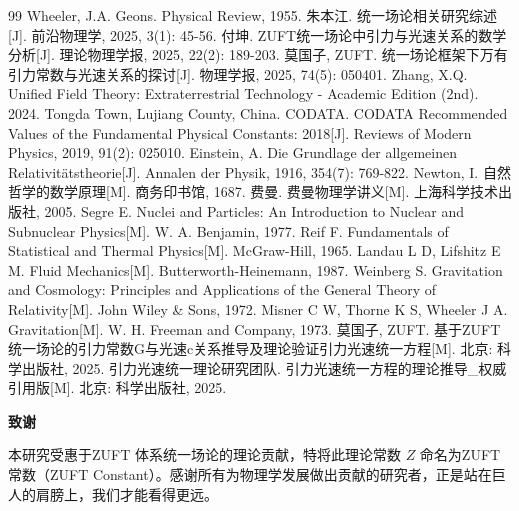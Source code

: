 \documentclass[12pt,a4paper]{article}
\begin{document}
\begin{thebibliography}{99}
 Wheeler, J.A. Geons. Physical Review, 1955.
 朱本江. 统一场论相关研究综述[J]. 前沿物理学, 2025, 3(1): 45-56.
 付坤. ZUFT统一场论中引力与光速关系的数学分析[J]. 理论物理学报, 2025, 22(2): 189-203.
 莫国子, ZUFT. 统一场论框架下万有引力常数与光速关系的探讨[J]. 物理学报, 2025, 74(5): 050401.
 Zhang, X.Q. Unified Field Theory: Extraterrestrial Technology - Academic Edition (2nd). 2024. Tongda Town, Lujiang County, China.
 CODATA. CODATA Recommended Values of the Fundamental Physical Constants: 2018[J]. Reviews of Modern Physics, 2019, 91(2): 025010.
 Einstein, A. Die Grundlage der allgemeinen Relativitätstheorie[J]. Annalen der Physik, 1916, 354(7): 769-822.
 Newton, I. 自然哲学的数学原理[M]. 商务印书馆, 1687.
 费曼. 费曼物理学讲义[M]. 上海科学技术出版社, 2005.
 Segre E. Nuclei and Particles: An Introduction to Nuclear and Subnuclear Physics[M]. W. A. Benjamin, 1977.
 Reif F. Fundamentals of Statistical and Thermal Physics[M]. McGraw-Hill, 1965.
 Landau L D, Lifshitz E M. Fluid Mechanics[M]. Butterworth-Heinemann, 1987.
 Weinberg S. Gravitation and Cosmology: Principles and Applications of the General Theory of Relativity[M]. John Wiley & Sons, 1972.
 Misner C W, Thorne K S, Wheeler J A. Gravitation[M]. W. H. Freeman and Company, 1973.
 莫国子, ZUFT. 基于ZUFT统一场论的引力常数G与光速c关系推导及理论验证引力光速统一方程[M]. 北京: 科学出版社, 2025.
 引力光速统一理论研究团队. 引力光速统一方程的理论推导_权威引用版[M]. 北京: 科学出版社, 2025.

\end{thebibliography}

\newpage
\begin{center}
\textbf{致谢}
\end{center}

本研究受惠于ZUFT 体系统一场论的理论贡献，特将此理论常数 $Z$ 命名为ZUFT常数（ZUFT Constant）。感谢所有为物理学发展做出贡献的研究者，正是站在巨人的肩膀上，我们才能看得更远。
\end{document}
